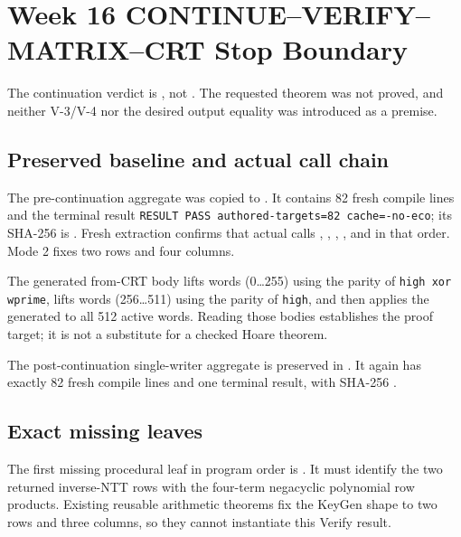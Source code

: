 \section{Week 16 CONTINUE--VERIFY--MATRIX--CRT Stop Boundary}

The continuation verdict is , not
.  The requested
 theorem was not
proved, and neither V-3/V-4 nor the desired output equality was introduced as
a premise.

\subsection*{Preserved baseline and actual call chain}

The pre-continuation aggregate was copied to
.  It contains 82 fresh
compile lines and the terminal result
\texttt{RESULT PASS authored-targets=82 cache=-no-eco}; its SHA-256 is
.
Fresh extraction confirms that actual  calls
, ,
, , and
 in that order.  Mode 2 fixes two rows and four
columns.

The generated from-CRT body lifts words (0\ldots255) using the parity of
\texttt{high xor wprime}, lifts words (256\ldots511) using the parity of
\texttt{high}, and then applies the generated  to all 512
active words.  Reading those bodies establishes the proof target; it is not a
substitute for a checked Hoare theorem.

The post-continuation single-writer aggregate is preserved in
.  It again has exactly
82 fresh compile lines and one terminal result, with SHA-256
.

\subsection*{Exact missing leaves}

The first missing procedural leaf in program order is
.  It must identify the
two returned inverse-NTT rows with the four-term negacyclic polynomial row
products.  Existing reusable arithmetic theorems fix the KeyGen shape to two
rows and three columns, so they cannot instantiate this Verify result.

